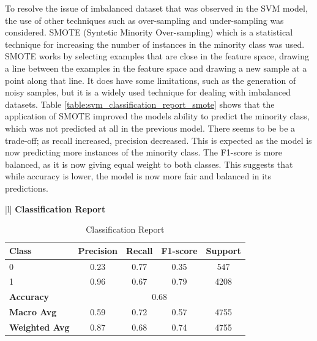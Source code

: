 To resolve the issue of imbalanced dataset that was observed in the SVM model, the use of other techniques such as over-sampling and under-sampling was considered.
SMOTE (Syntetic Minority Over-sampling) which is a statistical technique for increasing the number of instances in the minority class was used. SMOTE works by selecting
examples that are close in the feature space, drawing a line between the examples in the feature space and drawing a new sample at a point along that line. 
It does have some limitations, such as the generation of noisy samples, but it is a widely used technique for dealing with imbalanced datasets. \cite{website:smote} 
Table \ref{table:svm_classification_report_smote} shows that the application of SMOTE improved the models ability to predict the minority class, which was not predicted at all 
in the previous model. There seems to be be a trade-off; as recall increased, precision decreased. This is expected as the model is now predicting more instances of the minority class.
The F1-score is more balanced, as it is now giving equal weight to both classes. This suggests that while accuracy is lower, the model is now more fair and balanced in its predictions.

\begin{table}[H]
    \centering
    
    \begin{tabular}{|l|}
    \hline
    \textbf{Classification Report} \\
    \hline
    \begin{tabular}{|l|c|c|c|c|}
    \hline
    \textbf{Class} & \textbf{Precision} & \textbf{Recall} & \textbf{F1-score} & \textbf{Support} \\ \hline
    0              & 0.23               & 0.77            & 0.35              & 547              \\ \hline
    1              & 0.96               & 0.67            & 0.79              & 4208             \\ \hline
    \textbf{Accuracy} & \multicolumn{4}{c|}{0.68}                                \\ \hline
    \textbf{Macro Avg} & 0.59              & 0.72            & 0.57              & 4755             \\ \hline
    \textbf{Weighted Avg} & 0.87             & 0.68            & 0.74              & 4755             \\ \hline
    \end{tabular} \\
    \hline
    \end{tabular}
    \caption{Classification Report}
    \label{table:classification_report_smote}
\end{table}


